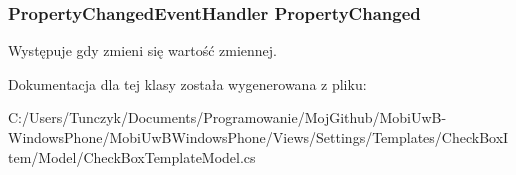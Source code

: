 \subsubsection[{Property\+Changed}]{\setlength{\rightskip}{0pt plus 5cm}Property\+Changed\+Event\+Handler Property\+Changed}\label{a00010_aa421d817626998e9bcafaf0d70106b7f}


Występuje gdy zmieni się wartość zmiennej. 



Dokumentacja dla tej klasy została wygenerowana z pliku\+:\begin{DoxyCompactItemize}
\item 
C\+:/\+Users/\+Tunczyk/\+Documents/\+Programowanie/\+Moj\+Github/\+Mobi\+Uw\+B-\/\+Windows\+Phone/\+Mobi\+Uw\+B\+Windows\+Phone/\+Views/\+Settings/\+Templates/\+Check\+Box\+Item/\+Model/Check\+Box\+Template\+Model.\+cs\end{DoxyCompactItemize}
